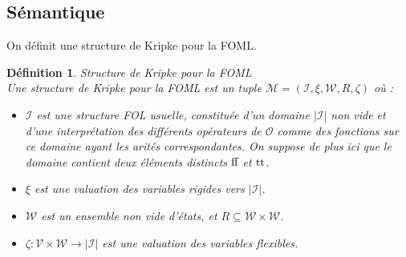 \documentclass[12pt]{article}
\newcommand{\false}{\textup{ff}}
\newcommand{\true}{\textup{tt}}
\newcommand{\M}{\ensuremath{\mathcal{M}}}
\newcommand{\I}{\ensuremath{\mathcal{I}}}
\newcommand{\raph}[1]{\textcolor{red}{#1}}
\newtheorem{defin}{Définition}
\begin{document}
\subsection{Sémantique}

On définit une structure de Kripke pour la FOML.

\begin{defin} \emph{Structure de Kripke pour la FOML} \\
  Une structure de Kripke pour la FOML est un tuple $\M = (\I, \xi, \mathcal{W}, R, \zeta)$ où :
  \begin{itemize}
  \item
    $\I$ est une structure FOL usuelle, constituée d'un domaine $|\I|$ non vide et d'une interprétation des différents opérateurs de $\mathcal{O}$ comme des fonctions sur ce domaine ayant les arités correspondantes.
    On suppose de plus ici que le domaine contient deux éléments distincts $\false$ et $\true$.
  \item
    $\xi$ est une valuation des variables rigides vers $|\I|$.
  \item
    $\mathcal{W}$ est un ensemble non vide d'états, et $R \subseteq \mathcal{W} \times \mathcal{W}$.
  \item
    $\zeta : \mathcal{V} \times \mathcal{W} \to |\I|$ est une valuation des variables flexibles.
  \end{itemize}
\end{defin}

\end{document}
